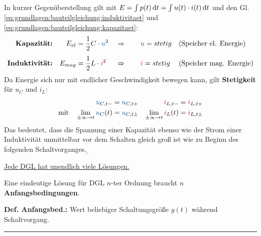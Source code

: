 \begin{frame}
{    In kurzer Gegenüberstellung gilt mit $E = \int p(t) \,\mathrm{d} t = \int u(t) \cdot i(t) \,\mathrm{d} t$ und den Gl. 
    \ref{eq:grundlagen:bauteilgleichung:induktivitaet} und \ref{eq:grundlagen:bauteilgleichung:kapazitaet}:
    \begin{align}
        \textbf{Kapazität:}     && E_{el}  &= \frac{1}{2} C \cdot \ecv{u}^2  &&\Rightarrow\qquad \ecv{u} = stetig && \text{(Speicher el. Energie)} \\[+4pt]
        \textbf{Induktivität:}  && E_{mag} &= \frac{1}{2} L \cdot \eci{i}^2  &&\Rightarrow\qquad \eci{i} = stetig && \text{(Speicher mag. Energie)}
    \end{align}
    Da Energie sich nur mit endlicher Geschwindigkeit bewegen kann, gilt \textbf{Stetigkeit} für $u_C$ und $i_L$:
    \begin{align}
        \ecv{u}_{C,t-} &= \ecv{u}_{C,t+} & 
        \eci{i}_{L,t-} &= \eci{i}_{L,t+} \\
        \text{mit}\quad 
        \lim_{\pm\infty \rightarrow t} \ecv{u}_C(t) &= \ecv{u}_{C,t\pm} & 
        \lim_{\pm\infty \rightarrow t} \eci{i}_L(t) &= \eci{i}_{L,t\pm}
    \end{align}
    Das bedeutet, dass die Spannung einer Kapazität ebenso wie der Strom einer Induktivität 
    unmittelbar vor dem Schalten gleich groß ist wie zu Beginn des folgenden Schaltvorganges.
}%
\b{
    \underline{Jede DGL hat unendlich viele Lösungen.}
    \vspace{0.25cm}
    \pause

    Eine eindeutige Lösung für DGL $n$-ter Ordnung braucht $n$ \textbf{Anfangsbedingungen}.
    \vspace{0.10cm}
    \pause

    \textbf{Def. Anfangsbed.:} Wert beliebiger Schaltungsgröße $y(t)$ während Schaltvorgang.
    \vspace{0.25cm}%
    \pause%
    \\[-10pt]\noindent\rule{\textwidth}{0.4pt} %
    
}
\end{frame}
